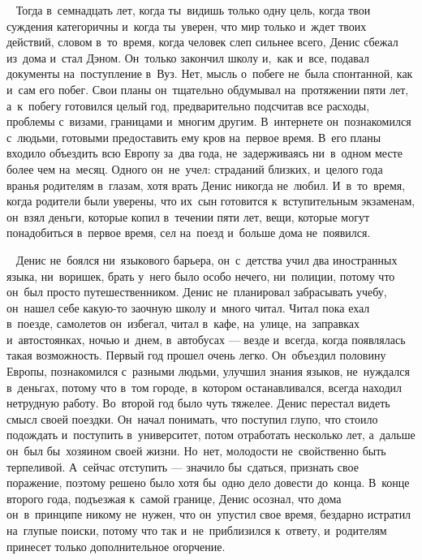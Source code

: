~
Тогда в~семнадцать лет, когда ты~видишь только одну цель, когда твои суждения категоричны и~когда ты~уверен, что мир только и~ждет твоих действий, словом в~то~время, когда человек слеп сильнее всего, Денис сбежал из~дома и~стал Дэном.
Он~только закончил школу и,~как и~все, подавал документы на~поступление в~Вуз.
Нет, мысль о~побеге не~была спонтанной, как и~сам его побег.
Свои планы он~тщательно обдумывал на~протяжении пяти лет, а~к~побегу готовился целый год, предварительно подсчитав все расходы, проблемы с~визами, границами и~многим другим.
В~интернете он~познакомился с~людьми, готовыми предоставить ему кров на~первое время.
В~его планы входило объездить всю Европу за~два года, не~задерживаясь ни~в~одном месте более чем на~месяц.
Одного он~не~учел: страданий близких, и~целого года вранья родителям в~глазам, хотя врать Денис никогда не~любил.
И~в~то~время, когда родители были уверены, что их~сын готовится к~вступительным экзаменам, он~взял деньги, которые копил в~течении пяти лет, вещи, которые могут понадобиться в~первое время, сел на~поезд и~больше дома не~появился.

~
Денис не~боялся ни~языкового барьера, он~с~детства учил два иностранных языка, ни~воришек, брать у~него было особо нечего, ни~полиции, потому что он~был просто путешественником.
Денис не~планировал забрасывать учебу, он~нашел себе какую-то заочную школу и~много читал.
Читал пока ехал в~поезде, самолетов он~избегал, читал в~кафе, на~улице, на~заправках и~автостоянках, ночью и~днем, в~автобусах --- везде и~всегда, когда появлялась такая возможность.
Первый год прошел очень легко.
Он~объездил половину Европы, познакомился с~разными людьми, улучшил знания языков, не~нуждался в~деньгах, потому что в~том городе, в~котором останавливался, всегда находил нетрудную работу.
Во~второй год было чуть тяжелее.
Денис перестал видеть смысл своей поездки.
Он~начал понимать, что поступил глупо, что стоило подождать и~поступить в~университет, потом отработать несколько лет, а~дальше он~был бы~хозяином своей жизни.
Но~нет, молодости не~свойственно быть терпеливой.
А~сейчас отступить --- значило бы~сдаться, признать свое поражение, поэтому решено было хотя бы~одно дело довести до~конца.
В~конце второго года, подъезжая к~самой границе, Денис осознал, что дома он~в~принципе никому не~нужен, что он~упустил свое время, бездарно истратил на~глупые поиски, потому что так и~не~приблизился к~ответу, и~родителям принесет только дополнительное огорчение.

